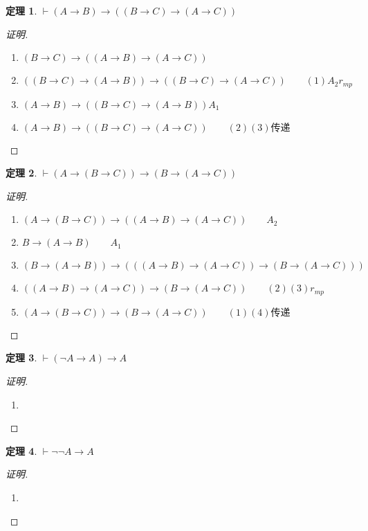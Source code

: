 \documentclass{article}
\newtheorem{Thm}{定理}
\begin{document}
\begin{CJK*}{UTF8}{gbsn}
  \begin{Thm}$\vdash (A\to B) \to ((B\to C)\to (A\to C))$\end{Thm}
  \begin{proof}[证明]$\quad$
    \begin{enumerate}
      \item  $(B\to C)\to ((A\to B)\to (A\to C))$
      \item $((B\to C)\to (A\to B))\to ((B\to C)\to (A\to C))\quad\quad (1)A_2 r_{mp}$
      \item $(A\to B) \to ((B\to C)\to (A\to B)) A_1$
      \item $(A\to B) \to ((B\to C)\to (A\to C)) \quad\quad(2)(3)\text{传递}$
    \end{enumerate}
  \end{proof}

  \begin{Thm}$\vdash (A\to(B\to C))\to (B\to (A\to C))$\end{Thm}
  \begin{proof}[证明]$\quad$
    \begin{enumerate}
      \item $(A\to(B\to C))\to ((A\to B)\to (A\to C))\quad\quad A_2$
      \item $B\to (A\to B) \quad\quad A_1$
      \item $(B\to (A\to B)) \to (((A\to B)\to (A\to C))\to (B\to (A\to C)))$
      \item $((A\to B)\to (A\to C))\to (B\to (A\to C))\quad\quad (2)(3)r_{mp}$
      \item $(A\to(B\to C))\to (B\to (A\to C))\quad\quad (1)(4)\text{传递}$
    \end{enumerate}
  \end{proof}

  \begin{Thm}$\vdash(\lnot A\to A)\to A$\end{Thm}
  \begin{proof}[证明]$\quad$
    \begin{enumerate}
      \item 
    \end{enumerate}
  \end{proof}

  \begin{Thm}$\vdash \lnot\lnot A\to A$\end{Thm}
  \begin{proof}[证明]$\quad$
    \begin{enumerate}
      \item 
    \end{enumerate}
  \end{proof}


\end{CJK*}
\end{document}
